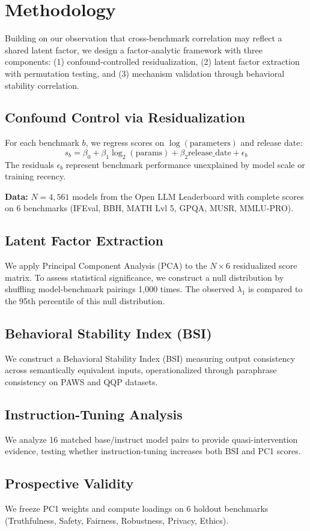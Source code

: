 \section{Methodology}

Building on our observation that cross-benchmark correlation may reflect a shared latent factor, we design a factor-analytic framework with three components: (1) confound-controlled residualization, (2) latent factor extraction with permutation testing, and (3) mechanism validation through behavioral stability correlation.

\subsection{Confound Control via Residualization}

For each benchmark $b$, we regress scores on $\log(\text{parameters})$ and release date:
\begin{equation}
s_b = \beta_0 + \beta_1 \log_2(\text{params}) + \beta_2 \text{release\_date} + \epsilon_b
\end{equation}
The residuals $\epsilon_b$ represent benchmark performance unexplained by model scale or training recency.

\textbf{Data:} $N = 4{,}561$ models from the Open LLM Leaderboard with complete scores on 6 benchmarks (IFEval, BBH, MATH Lvl 5, GPQA, MUSR, MMLU-PRO).

\subsection{Latent Factor Extraction}

We apply Principal Component Analysis (PCA) to the $N \times 6$ residualized score matrix. To assess statistical significance, we construct a null distribution by shuffling model-benchmark pairings 1,000 times. The observed $\lambda_1$ is compared to the 95th percentile of this null distribution.

\subsection{Behavioral Stability Index (BSI)}

We construct a Behavioral Stability Index (BSI) measuring output consistency across semantically equivalent inputs, operationalized through paraphrase consistency on PAWS \citep{zhang2019paws} and QQP \citep{wang2018qqp} datasets.

\subsection{Instruction-Tuning Analysis}

We analyze 16 matched base/instruct model pairs to provide quasi-intervention evidence, testing whether instruction-tuning increases both BSI and PC1 scores.

\subsection{Prospective Validity}

We freeze PC1 weights and compute loadings on 6 holdout benchmarks (Truthfulness, Safety, Fairness, Robustness, Privacy, Ethics).
